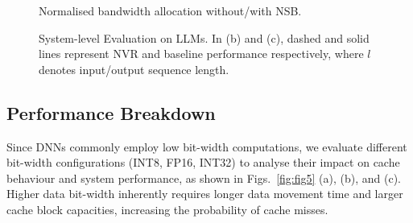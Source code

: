 \begin{figure}[t]
\centering
\vspace{-3pt}
\hspace{-10pt}
\hspace{-10pt}
\vspace{-8pt}
\caption{Normalised bandwidth allocation without/with NSB.}
\vspace{-5pt}
\label{fig:fig7}
\end{figure}


\begin{figure}[htbp]
\centering
\vspace{-10pt}
\hspace{-5pt}
\hspace{-17pt}
\hspace{-20pt}
\vspace{-10pt}
\caption{System-level Evaluation on LLMs. In (b) and (c), dashed and solid lines represent NVR and baseline performance respectively, where $l$ denotes input/output sequence length.}
\vspace{-15pt}
\label{fig:fig8}
\end{figure}




\vspace{-3pt}
\subsection{Performance Breakdown}
\vspace{-3pt}
Since DNNs commonly employ low bit-width computations, we evaluate different bit-width configurations (INT8, FP16, INT32) to analyse their impact on cache behaviour and system performance, as shown in Figs.~\ref{fig:fig5} (a), (b), and (c). 
Higher data bit-width inherently requires longer
data movement time and larger cache block capacities, increasing the probability of cache misses.


